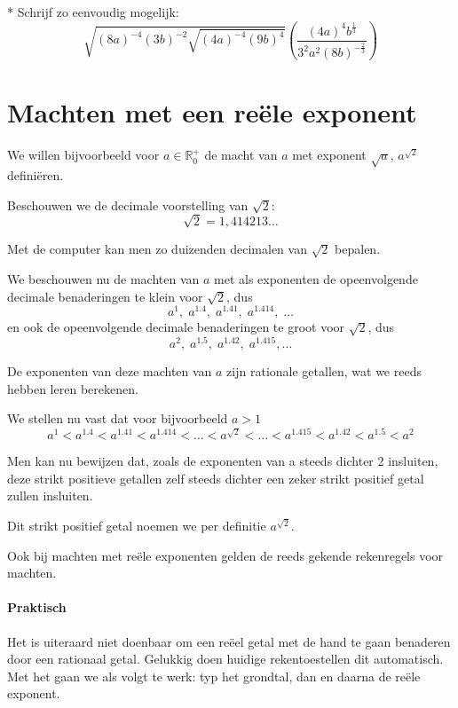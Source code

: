 \documentclass[12pt,twoside]{article}
\begin{document}
\begin{oefening}*
Schrijf zo eenvoudig mogelijk:
$$\sqrt{\left(8a\right)^{-4}\left(3b\right)^{-2}\sqrt{\left(4a\right)^{-4}\left(9b\right)^4}}\left(\dfrac{\left(4a\right)^4b^{\frac{1}{3}}}{3^2a^2\left(8b\right)^{-\frac{2}{3}}}\right)$$
\end{oefening}

\section{Machten met een reële exponent}

We willen bijvoorbeeld voor $a\in\mathbb{R}_0^+$ de macht van $a$ met exponent $\sqrt{a}$, $a^{\sqrt{2}}$ definiëren.

Beschouwen we de decimale voorstelling van $\sqrt{2}$:
$$\sqrt{2} = 1,414213\ldots$$

Met de computer kan men zo duizenden decimalen van $\sqrt{2}$ bepalen.

We beschouwen nu de machten van $a$ met als exponenten de opeenvolgende
decimale benaderingen te klein voor $\sqrt{2}$, dus
$$a^1,\; a^{1.4},\; a^{1.41},\; a^{1.414},\; \ldots$$
en ook de opeenvolgende decimale benaderingen te groot voor $\sqrt{2}$, dus
$$a^2,\; a^{1.5},\; a^{1.42},\; a^{1.415}, \ldots$$

De exponenten van deze machten van $a$ zijn rationale getallen, wat we reeds hebben leren berekenen.

We stellen nu vast dat voor bijvoorbeeld $a>1$
$$a^1 < a^{1.4} < a^{1.41} < a^{1.414} < \ldots < a^{\sqrt{2}} < \ldots < a^{1.415} < a^{1.42} < a^{1.5} < a^2$$

Men kan nu bewijzen dat, zoals de exponenten van a steeds dichter 2 insluiten,
deze strikt positieve getallen zelf steeds dichter een zeker strikt positief getal zullen
insluiten.

Dit strikt positief getal noemen we per definitie $a^{\sqrt{2}}$.

Ook bij machten met reële exponenten gelden de reeds gekende rekenregels voor machten.

\paragraph*{Praktisch}

Het is uiteraard niet doenbaar om een reëel getal met de hand te gaan benaderen door een rationaal getal. Gelukkig doen huidige rekentoestellen dit automatisch. Met het  gaan we als volgt te werk: typ het grondtal, dan  en daarna de reële exponent.
\end{document}
